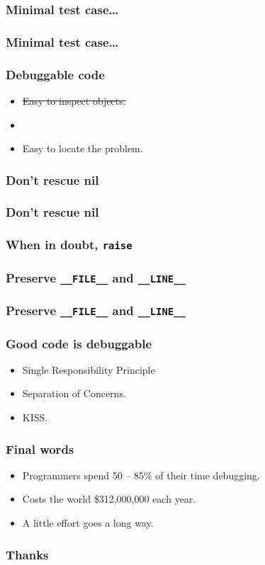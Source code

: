 \documentclass[14pt]{beamer}
\newlength{\wideitemsep}
\let\olditem\item
\renewcommand{\item}{\setlength{\itemsep}{\wideitemsep}\olditem}
\begin{document}
\begin{frame}[fragile]
  \frametitle{Minimal test case\ldots}
  
\end{frame}

\begin{frame}[fragile]
  \frametitle{Minimal test case\ldots}
  
\end{frame}

\frame
{
  \frametitle{Debuggable code}

  \begin{itemize}
  \item \sout{Easy to inspect objects.}
  \item {}
  \item Easy to locate the problem.
  \end{itemize}
}

\frame
{
  \frametitle{Don't rescue nil}

  \small
  
}
\frame
{
  \frametitle{Don't rescue nil}

  \small
  
}

\frame
{
  \frametitle{When in doubt, \texttt{raise}}

  \small
  
}

\frame
{
  \frametitle{Preserve \texttt{\_\_FILE\_\_} and \texttt{\_\_LINE\_\_}}

  \small
  
}

\frame
{
  \frametitle{Preserve \texttt{\_\_FILE\_\_} and \texttt{\_\_LINE\_\_}}

  \small
  
}

\frame
{
  \frametitle{Good code is debuggable}

  \begin{itemize}
  \item Single Responsibility Principle
  \item Separation of Concerns.
  \item KISS.
  \end{itemize}
}

\frame
{
  \frametitle{Final words}

  \begin{itemize}
  \item Programmers spend 50 -- 85\% of their time debugging.
  \item Costs the world \$312,000,000 each year.
  \item A little effort goes a long way.
  \end{itemize}

}

\frame
{
  \frametitle{Thanks}


}
\end{document}
